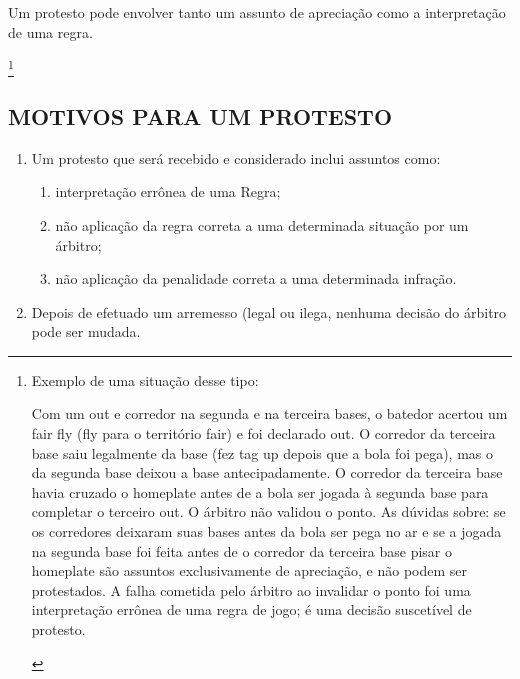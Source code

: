 \begin{multicols}{2}
Um protesto pode envolver tanto um assunto de aprecia\c{c}\~ao como a interpreta\c{c}\~ao de uma regra. 

\footnote{Exemplo de uma situa\c{c}\~ao desse tipo: 
\begin{center}
\begin{minipage}{.90\columnwidth}
	\color{black!80}
	
	Com um \gls{out} e corredor na segunda e na terceira bases, o batedor acertou um \gls{fair fly} (\gls{fly} para o território \gls{fair}) e foi declarado \gls{out}. 
	O corredor da terceira base saiu legalmente da base (fez \gls{tag up} depois que a bola foi pega), mas o da segunda base deixou a base antecipadamente.
	 O corredor da terceira base havia cruzado o \gls{homeplate} antes de a bola ser jogada \`a segunda base para completar o terceiro \gls{out}. 
	 O \'arbitro n\~ao validou o ponto. 
	 As d\'uvidas sobre: se os corredores deixaram suas bases antes da bola ser pega no ar e se a jogada na segunda base foi feita antes de o corredor da terceira base pisar o \gls{homeplate} s\~ao assuntos exclusivamente de aprecia\c{c}\~ao, e n\~ao podem ser protestados. A falha cometida pelo \'arbitro ao invalidar o ponto foi uma interpreta\c{c}\~ao errônea de uma regra de jogo; \'e uma decis\~ao suscet\'ivel 
	de protesto.
\end{minipage}
\end{center} 
}

\subsection{MOTIVOS PARA UM PROTESTO}

\begin{enumerate}[label=\alph*)]
	\item Um protesto que ser\'a recebido e considerado inclui assuntos como: 
	
	\begin{enumerate}[label=\roman* -]
		\item interpreta\c{c}\~ao errônea de uma Regra; 
		\item n\~ao aplica\c{c}\~ao da regra correta a uma determinada situa\c{c}\~ao por um \'arbitro; 
		\item n\~ao aplica\c{c}\~ao da penalidade correta a uma determinada infra\c{c}\~ao. 
	\end{enumerate}
	\item  Depois de efetuado um arremesso (legal ou ilega, nenhuma decis\~ao do \'arbitro pode ser mudada. 
	

\end{enumerate}
\end{multicols}
